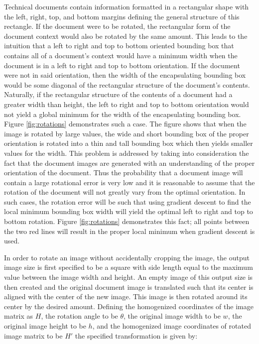 \documentclass[10pt]{IEEEtran}
\begin{document}
Technical documents contain information formatted in a rectangular shape with the left, right, top, and bottom margins defining the general structure of this rectangle. If the document were to be rotated, the rectangular form of the document context would also be rotated by the same amount. This leads to the intuition that a left to right and top to bottom oriented bounding box that contains all of a document's context would have a minimum width when the document is in a left to right and top to bottom orientation. If the document were not in said orientation, then the width of the encapsulating bounding box would be some diagonal of the rectangular structure of the document's contents. Naturally, if the rectangular structure of the contents of a document had a greater width than height, the left to right and top to bottom orientation would not yield a global minimum for the width of the encapsulating bounding box. Figure \ref{fig:rotations} demonstrates such a case. The figure shows that when the image is rotated by large values, the wide and short bounding box of the proper orientation is rotated into a thin and tall bounding box which then yields smaller values for the width. This problem is addressed by taking into consideration the fact that the document images are generated with an understanding of the proper orientation of the document. Thus the probability that a document image will contain a large rotational error is very low and it is reasonable to assume that the rotation of the document will not greatly vary from the optimal orientation. In such cases, the rotation error will be such that using gradient descent to find the local minimum bounding box width will yield the optimal left to right and top to bottom rotation. Figure \ref{fig:rotations} demonstrates this fact; all points between the two red lines will result in the proper local minimum when gradient descent is used.

In order to rotate an image without accidentally cropping the image, the output image size is first specified to be a square with side length equal to the maximum value between the image width and height. An empty image of this output size is then created and the original document image is translated such that its center is aligned with the center of the new image. This image is then rotated around its center by the desired amount. Defining the homogenized coordinates of the image matrix as $H$, the rotation angle to be $\theta$, the original image width to be $w$, the original image height to be $h$, and the homogenized image coordinates of rotated image matrix to be $H'$ the specified transformation is given by:
\end{document}
